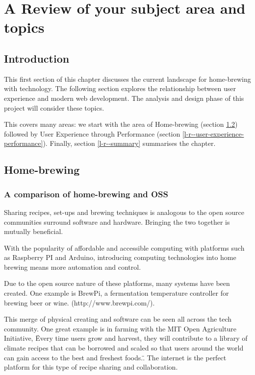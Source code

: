 \chapter{A Review of your subject area and topics}

\section{Introduction} \label{l-r--introduction}

This first section of this chapter discusses the current landscape for home-brewing with technology. The following section explores the relationship between user experience and modern web development. The analysis and design phase of this project will consider these topics.


This covers many areas: we start with the area of Home-brewing (section \ref{l-r--home-brewing}) followed by User Experience through Performance (section \ref{l-r--user-experience-performance}). Finally, section \ref{l-r--summary} summarises the chapter.

\section{Home-brewing} \label{l-r--home-brewing}



\subsection{A comparison of home-brewing and OSS}

Sharing recipes, set-ups and brewing techniques is analogous to the open source communities surround software and hardware. Bringing the two together is mutually beneficial.

With the popularity of affordable and accessible computing with platforms such as Raspberry PI and Arduino, introducing computing technologies into home brewing means more automation and control.

Due to the open source nature of these platforms, many systems have been created. One example is BrewPi, a fermentation temperature controller for brewing beer or wine. (http://www.brewpi.com/). \cite{brewpi}

This merge of physical creating and software can be seen all across the tech community. One great example is in farming with the MIT Open Agriculture Initiative, \"Every time users grow and harvest, they will contribute to a library of climate recipes that can be borrowed and scaled so that users around the world can gain access to the best and freshest foods.\". The internet is the perfect platform for this type of recipe sharing and collaboration. \cite{climate_recipes}

